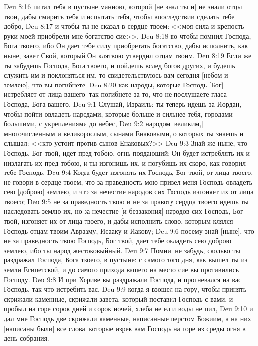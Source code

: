 \vs Deu 8:16 питал тебя в пустыне манною, которой [не знал ты и] не знали отцы твои, дабы смирить тебя и испытать тебя, чтобы впоследствии сделать тебе добро,
\vs Deu 8:17 и чтобы ты не сказал в сердце твоем: <<моя сила и крепость руки моей приобрели мне богатство сие>>,
\vs Deu 8:18 но чтобы помнил Господа, Бога твоего, ибо Он дает тебе силу приобретать богатство, дабы исполнить, как ныне, завет Свой, который Он клятвою утвердил отцам твоим.
\vs Deu 8:19 Если же ты забудешь Господа, Бога твоего, и пойдешь вслед богов других, и будешь служить им и поклоняться им, то свидетельствуюсь вам сегодня [небом и землею], что вы погибнете;
\vs Deu 8:20 как народы, которые Господь [Бог] истребляет от лица вашего, так погибнете  за то, что не послушаете гласа Господа, Бога вашего.
\vs Deu 9:1 Слушай, Израиль: ты теперь идешь за Иордан, чтобы пойти овладеть народами, которые больше и сильнее тебя, городами большими, с укреплениями до небес,
\vs Deu 9:2 народом [великим,] многочисленным и великорослым, сынами Енаковыми, о которых ты знаешь и слышал: <<кто устоит против сынов Енаковых?>>
\vs Deu 9:3 Знай же ныне, что Господь, Бог твой, идет пред тобою,  огнь поядающий; Он будет истреблять их и низлагать их пред тобою, и ты изгонишь их, и погубишь их скоро, как говорил тебе Господь.
\vs Deu 9:4 Когда будет изгонять их Господь, Бог твой, от лица твоего, не говори в сердце твоем, что за праведность мою привел меня Господь овладеть сею [доброю] землею, и что за нечестие народов сих Господь изгоняет их от лица твоего;
\vs Deu 9:5 не за праведность твою и не за правоту сердца твоего идешь ты наследовать землю их, но за нечестие [и беззакония] народов сих Господь, Бог твой, изгоняет их от лица твоего, и дабы исполнить слово, которым клялся Господь отцам твоим Аврааму, Исааку и Иакову;
\vs Deu 9:6 посему знай [ныне], что не за праведность твою Господь, Бог твой, дает тебе овладеть сею доброю землею, ибо ты народ жестоковыйный.
\vs Deu 9:7 Помни, не забудь, сколько ты раздражал Господа, Бога твоего, в пустыне: с самого того дня, как вышел ты из земли Египетской, и до самого прихода вашего на место сие вы противились Господу.
\vs Deu 9:8 И при Хориве вы раздражали Господа, и прогневался на вас Господь, так что  истребить вас,
\vs Deu 9:9 когда я взошел на гору, чтобы принять скрижали каменные, скрижали завета, который поставил Господь с вами, и пробыл на горе сорок дней и сорок ночей, хлеба не ел и воды не пил,
\vs Deu 9:10 и дал мне Господь две скрижали каменные, написанные перстом Божиим, а на них [написаны были] все слова, которые изрек вам Господь на горе из среды огня в день собрания.
